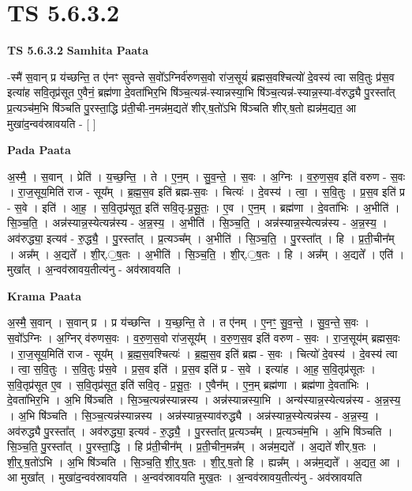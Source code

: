 \documentclass[17pt]{extarticle}
\begin{document}
\section{ TS 5.6.3.2 }

\textbf{TS 5.6.3.2 } \newline
\textbf{Samhita Paata} \newline

-स्मै॑ स॒वान् प्र य॑च्छन्ति॒ त ए॑नꣳ सुवन्ते स॒वो᳚ऽग्निर्व॑रुणस॒वो रा॑ज॒सूयं॑ ब्रह्मस॒वश्चित्यो॑ दे॒वस्य॑ त्वा सवि॒तुः प्र॑स॒व इत्या॑ह सवि॒तृप्र॑सूत ए॒वैनं॒ ब्रह्म॑णा दे॒वता॑भिर॒भि षि॑ञ्च॒त्यन्न॑-स्यान्नस्या॒भि षि॑ञ्च॒त्यन्न॑-स्यान्न॒स्या-व॑रुद्ध्यै पु॒रस्ता᳚त् प्र॒त्यञ्च॑म॒भि षि॑ञ्चति पु॒रस्ता॒द्धि प्र॑ती॒ची-न॒मन्न॑म॒द्यते॑ शीर्.ष॒तो॑ऽभि षि॑ञ्चति शीर्.ष॒तो ह्यन्न॑म॒द्यत॒ आ मुखा॑द॒न्वव॑स्रावयति - [  ] \newline

\textbf{Pada Paata} \newline

अ॒स्मै॒ । स॒वान् । प्रेति॑ । य॒च्छ॒न्ति॒ । ते । ए॒न॒म् । सु॒व॒न्ते॒ । स॒वः । अ॒ग्निः । व॒रु॒ण॒स॒व इति॑ वरुण - स॒वः । रा॒ज॒सूय॒मिति॑ राज - सूय᳚म् । ब्र॒ह्म॒स॒व इति॑ ब्रह्म-स॒वः । चित्यः॑ । दे॒वस्य॑ । त्वा॒ । स॒वि॒तुः । प्र॒स॒व इति॑ प्र - स॒वे । इति॑ । आ॒ह॒ । स॒वि॒तृप्र॑सूत॒ इति॑ सवि॒तृ-प्र॒सू॒तः॒ । ए॒व । ए॒न॒म् । ब्रह्म॑णा । दे॒वता॑भिः । अ॒भीति॑ । सि॒ञ्च॒ति॒ । अन्न॑स्यान्न॒स्येत्यन्न॑स्य - अ॒न्न॒स्य॒ । अ॒भीति॑ । सि॒ञ्च॒ति॒ । अन्न॑स्यान्न॒स्येत्यन्न॑स्य - अ॒न्न॒स्य॒ । अव॑रुद्ध्या॒ इत्यव॑ - रु॒द्ध्यै॒ । पु॒रस्ता᳚त् । प्र॒त्यञ्च᳚म् । अ॒भीति॑ । सि॒ञ्च॒ति॒ । पु॒रस्ता᳚त् । हि । प्र॒ती॒चीन᳚म् । अन्न᳚म् । अ॒द्यते᳚ । शी॒र्.॒ष॒तः । अ॒भीति॑ । सि॒ञ्च॒ति॒ । शी॒र्.॒ष॒तः । हि । अन्न᳚म् । अ॒द्यते᳚ । एति॑ । मुखा᳚त् । अ॒न्वव॑स्रावय॒तीत्य॑नु - अव॑स्रावयति ।  \newline


\textbf{Krama Paata} \newline

अ॒स्मै॒ स॒वान् । स॒वान् प्र । प्र य॑च्छन्ति । य॒च्छ॒न्ति॒ ते । त ए॑नम् । ए॒नꣳ॒॒ सु॒व॒न्ते॒ । सु॒व॒न्ते॒ स॒वः । स॒वो᳚ऽग्निः । अ॒ग्निर् व॑रुणस॒वः । व॒रु॒ण॒स॒वो रा॑ज॒सूय᳚म् । व॒रु॒ण॒स॒व इति॑ वरुण - स॒वः । रा॒ज॒सूय॑म् ब्रह्मस॒वः । रा॒ज॒सूय॒मिति॑ राज - सूय᳚म् । ब्र॒ह्म॒स॒वश्चित्यः॑ । ब्र॒ह्म॒स॒व इति॑ ब्रह्म - स॒वः । चित्यो॑ दे॒वस्य॑ । दे॒वस्य॑ त्वा । त्वा॒ स॒वि॒तुः । स॒वि॒तुः प्र॑स॒वे । प्र॒स॒व इति॑ । प्र॒स॒व इति॑ प्र - स॒वे । इत्या॑ह । आ॒ह॒ स॒वि॒तृप्र॑सूतः । स॒वि॒तृप्र॑सूत ए॒व । स॒वि॒तृप्र॑सूत॒ इति॑ सवि॒तृ - प्र॒सू॒तः॒ । ए॒वैन᳚म् । ए॒न॒म् ब्रह्म॑णा । ब्रह्म॑णा दे॒वता॑भिः । दे॒वता॑भिर॒भि । अ॒भि षि॑ञ्चति । सि॒ञ्च॒त्यन्न॑स्यान्नस्य । अन्न॑स्यान्नस्या॒भि । अन्य॑स्यान्न॒स्येत्यन्न॑स्य - अ॒न्न॒स्य॒ । 
अ॒भि षि॑ञ्चति । सि॒ञ्च॒त्यन्न॑स्यान्नस्य । अन्न॑स्यान्न॒स्याव॑रुद्ध्यै । अन्न॑स्यान्न॒स्येत्यन्न॑स्य - अ॒न्न॒स्य॒ । अव॑रुद्ध्यै पु॒रस्ता᳚त् । अव॑रुद्ध्या॒ इत्यव॑ - रु॒द्ध्यै॒ । पु॒रस्ता᳚त् प्र॒त्यञ्च᳚म् । प्र॒त्यञ्च॑म॒भि । अ॒भि षि॑ञ्चति । सि॒ञ्च॒ति॒ पु॒रस्ता᳚त् । पु॒रस्ता॒द्धि । हि प्र॑ती॒चीन᳚म् । प्र॒ती॒चीन॒मन्न᳚म् । अन्न॑म॒द्यते᳚ । अ॒द्यते॑ शीर्.ष॒तः । शी॒र्॒.ष॒तो॑ऽभि । अ॒भि षि॑ञ्चति । सि॒ञ्च॒ति॒ शी॒र्॒.ष॒तः । शी॒र्॒.ष॒तो हि । ह्यन्न᳚म् । अन्न॑म॒द्यते᳚ । अ॒द्यत॒ आ । आ मुखा᳚त् । मुखा॑द॒न्वव॑स्रावयति । अ॒न्वव॑स्रावयति मुख॒तः । अ॒न्वव॑स्रावय॒तीत्य॑नु - अव॑स्रावयति \newline
\end{document}
